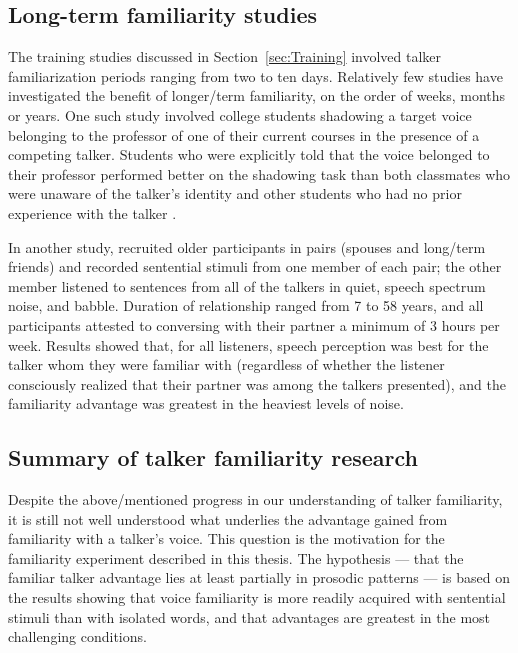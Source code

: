 \subsection{Long-term familiarity studies\label{sec:LongTerm}}
The training studies discussed in Section~\ref{sec:Training} involved talker familiarization periods ranging from two to ten days.  Relatively few studies have investigated the benefit of longer\-/term familiarity, on the order of weeks, months or years.  One such study involved college students shadowing a target voice belonging to the professor of one of their current courses in the presence of a competing talker.  Students who were explicitly told that the voice belonged to their professor performed better on the shadowing task than both classmates who were unaware of the talker’s identity and other students who had no prior experience with the talker \citep{NewmanEvers2007}.  

In another study, \citet{SouzaEtAl2013} recruited older participants in pairs (spouses and long\-/term friends) and recorded sentential stimuli from one member of each pair; the other member listened to sentences from all of the talkers in quiet, speech spectrum noise, and babble.  Duration of relationship ranged from 7 to 58 years, and all participants attested to conversing with their partner a minimum of 3 hours per week.  Results showed that, for all listeners, speech perception was best for the talker whom they were familiar with (regardless of whether the listener consciously realized that their partner was among the talkers presented), and the familiarity advantage was greatest in the heaviest levels of noise.

\subsection{Summary of talker familiarity research}
Despite the above\-/mentioned progress in our understanding of talker familiarity, it is still not well understood what underlies the advantage gained from familiarity with a talker’s voice.  This question is the motivation for the familiarity experiment described in this thesis.  The hypothesis — that the familiar talker advantage lies at least partially in prosodic patterns — is based on the results showing that voice familiarity is more readily acquired with sentential stimuli than with isolated words, and that advantages are greatest in the most challenging conditions.


